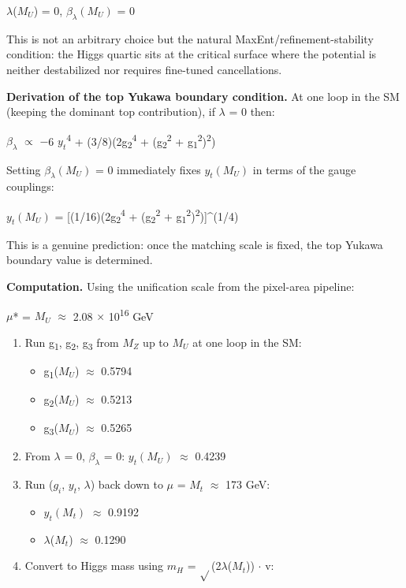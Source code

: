 \documentclass[11pt,a4paper]{article}
\theoremstyle{remark}
\providecommand{\tightlist}{%
  \setlength{\itemsep}{0pt}\setlength{\parskip}{0pt}}
\begin{document}
\ensuremath{\lambda}(\(M_U\)) = 0, \(\ensuremath{\beta}_\ensuremath{\lambda}(M_U)\) = 0

This is not an arbitrary choice but the natural MaxEnt/refinement-stability condition: the Higgs quartic sits at the critical surface where the potential is neither destabilized nor requires fine-tuned cancellations.

\textbf{Derivation of the top Yukawa boundary condition.} At one loop in the SM (keeping the dominant top contribution), if \ensuremath{\lambda} = 0 then:

\(\ensuremath{\beta}_\ensuremath{\lambda}\) \ensuremath{\propto} \ensuremath{-}6 \(y_t\)\textsuperscript{4} + (3/8)(2g\textsubscript{2}\textsuperscript{4} + (g\textsubscript{2}\textsuperscript{2} + g\textsubscript{1}\textsuperscript{2})\textsuperscript{2})

Setting \(\ensuremath{\beta}_\ensuremath{\lambda}(M_U)\) = 0 immediately fixes \(y_t(M_U)\) in terms of the gauge couplings:

\(y_t(M_U)\) = {[}(1/16)(2g\textsubscript{2}\textsuperscript{4} + (g\textsubscript{2}\textsuperscript{2} + g\textsubscript{1}\textsuperscript{2})\textsuperscript{2}){]}\^{}(1/4)

This is a genuine prediction: once the matching scale is fixed, the top Yukawa boundary value is determined.

\textbf{Computation.} Using the unification scale from the pixel-area pipeline:

\ensuremath{\mu}* = \(M_U\) \ensuremath{\approx} 2.08 \ensuremath{\times} 10\textsuperscript{16} GeV

\begin{enumerate}
\def\labelenumi{\arabic{enumi}.}
\item
  Run g\textsubscript{1}, g\textsubscript{2}, g\textsubscript{3} from \(M_Z\) up to \(M_U\) at one loop in the SM:

  \begin{itemize}
  \tightlist
  \item
    g\textsubscript{1}(\(M_U\)) \ensuremath{\approx} 0.5794
  \item
    g\textsubscript{2}(\(M_U\)) \ensuremath{\approx} 0.5213
  \item
    g\textsubscript{3}(\(M_U\)) \ensuremath{\approx} 0.5265
  \end{itemize}
\item
  From \ensuremath{\lambda} = 0, \(\ensuremath{\beta}_\ensuremath{\lambda}\) = 0: \(y_t(M_U)\) \ensuremath{\approx} 0.4239
\item
  Run (\(g_i\), \(y_t\), \ensuremath{\lambda}) back down to \ensuremath{\mu} = \(M_t\) \ensuremath{\approx} 173 GeV:

  \begin{itemize}
  \tightlist
  \item
    \(y_t(M_t)\) \ensuremath{\approx} 0.9192
  \item
    \ensuremath{\lambda}(\(M_t\)) \ensuremath{\approx} 0.1290
  \end{itemize}
\item
  Convert to Higgs mass using \(m_H\) = \ensuremath{\sqrt{}}(2\ensuremath{\lambda}(\(M_t\))) \ensuremath{\cdot} v:
\end{enumerate}
\end{document}
